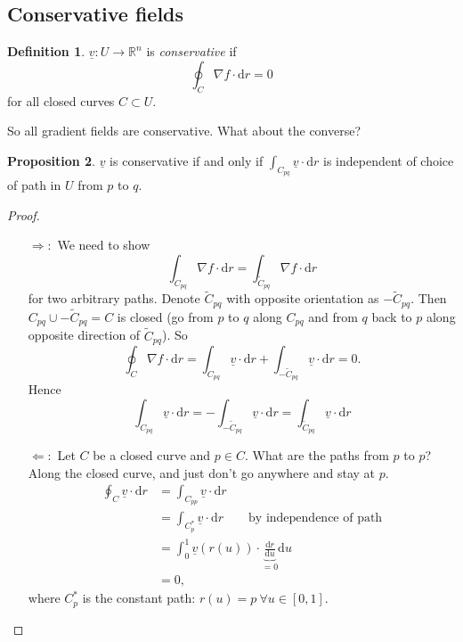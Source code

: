 \documentclass[a4paper]{article}
\theoremstyle{definition}
\newtheorem{defn}{Definition}[subsection]
\newtheorem{prop}[defn]{Proposition}
\begin{document}
\subsection{Conservative fields}
\begin{defn}
$\underline v:U\rightarrow \mathbb R^n$ is \textit{conservative} if
\[
\oint_C \nabla f \cdot \mathrm d r = 0
\]
for all closed curves $C\subset U$.
\end{defn}
So all gradient fields are conservative. What about the converse?
\begin{prop}
$\underline v$ is conservative if and only if $\int_{C_{pq}} \underline v \cdot \mathrm d r$ is independent of choice of path in $U$ from $p$ to $q$.
\end{prop}
\begin{proof}
\begin{itemize}
    \item[$\Rightarrow:$] We need to show
    \[
    \int_{C_{pq}} \nabla f \cdot \mathrm d r=\int_{\tilde{C}_{pq}} \nabla f \cdot \mathrm d r
    \]
    for two arbitrary paths. Denote $\tilde{C}_{pq}$ with opposite orientation as $-\tilde{C}_{pq}$. Then $C_{pq} \cup -\tilde{C}_{pq} = C$ is closed (go from $p$ to $q$ along $C_{pq}$ and from $q$ back to $p$ along opposite direction of $\tilde{C}_{pq}$). So
    \[
    \oint_C \nabla f \cdot \mathrm d r = \int_{C_{pq}} \underline v \cdot \mathrm d r + \int_{-\tilde{C}_{pq}} \underline v \cdot \mathrm d r = 0.
    \]
    Hence
    \[
    \int_{C_{pq}} \underline v \cdot \mathrm d r=-\int_{-\tilde{C}_{pq}} \underline v \cdot \mathrm d r=\int_{\tilde{C}_{pq}} \underline v \cdot \mathrm d r
    \]
    \item[$\Leftarrow:$] Let $C$ be a closed curve and $p\in C$. What are the paths from $p$ to $p$? Along the closed curve, and just don't go anywhere and stay at $p$.
    \[
    \begin{aligned}
    \oint_C \underline v \cdot \mathrm d r &= \int_{C_{pp}}\underline v \cdot \mathrm d r \\&=\int_{C_p^\ast} \underline v \cdot \mathrm d r \qquad \text{by independence of path} \\&= \int_0^1 \underline v (r(u)) \cdot \underbrace{\frac{\mathrm d r}{\mathrm d u}}_{=0}  \mathrm d u \\&=0 ,
    \end{aligned}
    \]
    where $C_p^\ast$ is the constant path: $r(u) = p \ \forall u\in [0,1]$.
\end{itemize}
\end{proof}
\end{document}
